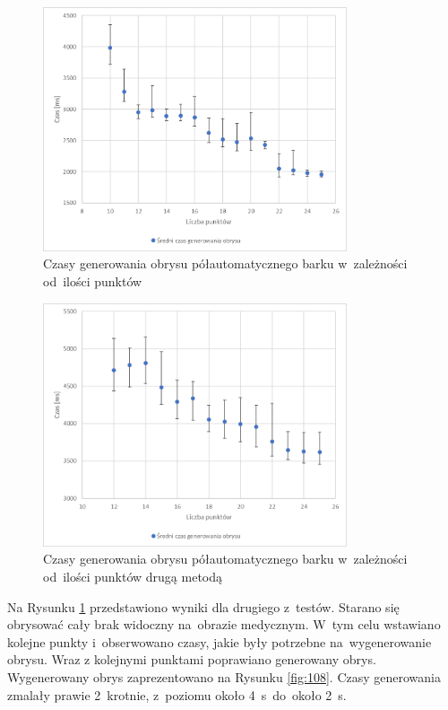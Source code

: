 \documentclass[a4paper,11pt,twoside,openright]{report}
\theoremstyle{definition}
\begin{document}
\begin{figure}[h!]
	\center
	\includegraphics[width=0.8\textwidth]{testy_2}
	\caption{Czasy generowania obrysu półautomatycznego barku w~zależności od~ilości punktów}
    	\label{fig:testy_2}
\end{figure}

\begin{figure}[htb!]
	\center
	\includegraphics[width=0.8\textwidth]{testy_3}
	\caption{Czasy generowania obrysu półautomatycznego barku w~zależności od~ilości punktów drugą metodą}
    	\label{fig:testy_3}
\end{figure}

Na Rysunku \ref{fig:testy_2} przedstawiono wyniki dla drugiego z~testów. Starano
się obrysować cały brak widoczny na~obrazie medycznym. W~tym celu wstawiano kolejne
punkty i~obserwowano czasy, jakie były potrzebne na~wygenerowanie obrysu. Wraz z
kolejnymi punktami poprawiano generowany obrys. Wygenerowany obrys zaprezentowano
na Rysunku \ref{fig:108}. Czasy generowania zmalały prawie 2~krotnie, z~poziomu
około 4~s~do~około 2~s.
\end{document}
